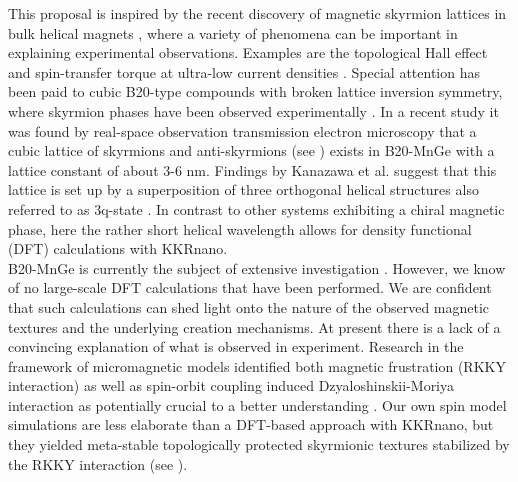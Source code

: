 \documentclass [a4paper, 12pt]{article}
\begin{document}
This proposal is inspired by the recent discovery of magnetic skyrmion lattices in bulk helical magnets
\cite{muhlbauer_skyrmion_2009,yu_real-space_2010,yu_near_2011,shibata_towards_2013},
where a variety of phenomena can be important in explaining experimental observations.
Examples are the topological Hall effect and spin-transfer torque at ultra-low current densities
\cite{kanazawa_large_2011}.
Special attention has been paid to cubic B20-type compounds with broken lattice inversion symmetry,
where skyrmion phases have been observed experimentally
\cite{nagaosa_topological_2013}.
In a recent study \cite{tanigaki_real-space_2015} 
it was found by real-space observation transmission electron microscopy 
that a cubic lattice of skyrmions and anti-skyrmions (see ) exists in B20-MnGe with
a lattice constant of about 3-6 nm. Findings by Kanazawa et al. suggest that this
lattice is set up by a superposition of three orthogonal helical
structures also referred to as 3q-state \cite{kanazawa_noncentrosymmetric_2017}.
In contrast to other systems exhibiting a chiral magnetic phase,
here the rather short helical wavelength allows for density functional (DFT) calculations
with KKRnano. 
\\
B20-MnGe is currently the subject of extensive investigation
\cite{tanigaki_real-space_2015,kanazawa_large_2011,kanazawa_possible_2012,grigoriev_chiral_2013,
martin_magnetic_2016}.
However, we know of no large-scale DFT calculations that have been performed.
We are confident that such calculations can shed light onto the nature of
the observed magnetic textures and the underlying creation mechanisms.
At present there is a lack of a convincing explanation of what is observed in experiment. 
Research in the framework of micromagnetic models identified both magnetic frustration (RKKY interaction) 
as well as spin-orbit coupling induced Dzyaloshinskii-Moriya interaction as potentially
crucial to a better understanding \cite{altynbaev_hidden_2016,koretsune_control_2015}.
Our own spin model simulations are less elaborate than a DFT-based approach with KKRnano, but they
yielded meta-stable
topologically protected skyrmionic textures \cite{bornemann_investigation_2017} stabilized by the RKKY interaction
(see ).
\end{document}
